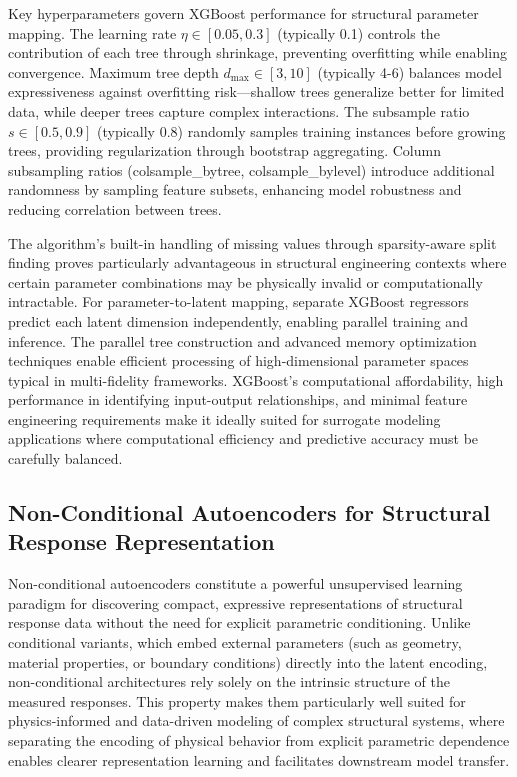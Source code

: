 \documentclass[12pt,a4paper]{report}
\begin{document}
Key hyperparameters govern XGBoost performance for structural parameter mapping. The learning rate $\eta \in [0.05, 0.3]$ (typically 0.1) controls the contribution of each tree through shrinkage, preventing overfitting while enabling convergence. Maximum tree depth $d_{\text{max}} \in [3, 10]$ (typically 4-6) balances model expressiveness against overfitting risk—shallow trees generalize better for limited data, while deeper trees capture complex interactions. The subsample ratio $s \in [0.5, 0.9]$ (typically 0.8) randomly samples training instances before growing trees, providing regularization through bootstrap aggregating. Column subsampling ratios (colsample\_bytree, colsample\_bylevel) introduce additional randomness by sampling feature subsets, enhancing model robustness and reducing correlation between trees.

The algorithm's built-in handling of missing values through sparsity-aware split finding proves particularly advantageous in structural engineering contexts where certain parameter combinations may be physically invalid or computationally intractable. For parameter-to-latent mapping, separate XGBoost regressors predict each latent dimension independently, enabling parallel training and inference. The parallel tree construction and advanced memory optimization techniques enable efficient processing of high-dimensional parameter spaces typical in multi-fidelity frameworks. XGBoost's computational affordability, high performance in identifying input-output relationships, and minimal feature engineering requirements make it ideally suited for surrogate modeling applications where computational efficiency and predictive accuracy must be carefully balanced.


\subsection{Non-Conditional Autoencoders for Structural Response Representation}

\noindent
Non-conditional autoencoders constitute a powerful unsupervised learning paradigm for discovering compact, expressive representations of structural response data without the need for explicit parametric conditioning. Unlike conditional variants, which embed external parameters (such as geometry, material properties, or boundary conditions) directly into the latent encoding, non-conditional architectures rely solely on the intrinsic structure of the measured responses. This property makes them particularly well suited for physics-informed and data-driven modeling of complex structural systems, where separating the encoding of physical behavior from explicit parametric dependence enables clearer representation learning and facilitates downstream model transfer.
\end{document}
